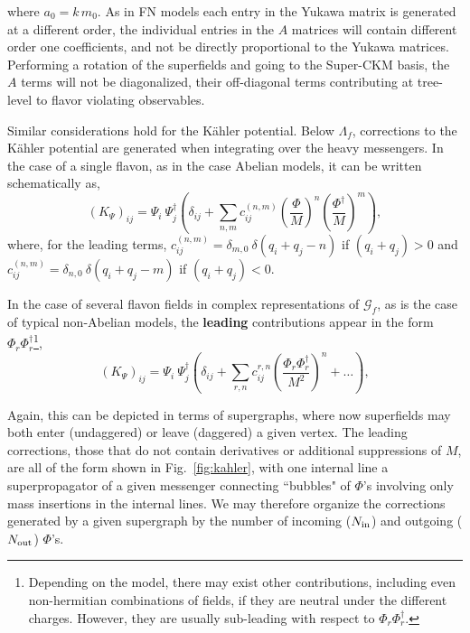 \documentclass[a4paper,11pt]{article}
\begin{document}
where $a_0=k\, m_0$. %
As in FN models each entry in the Yukawa matrix is generated at a different order, the individual entries in the $A$ matrices will contain different order one coefficients, and not be directly proportional to the Yukawa matrices. Performing a rotation of the superfields and going to the Super-CKM basis, the $A$ terms will not be diagonalized, their off-diagonal terms contributing at tree-level to flavor violating observables.

Similar considerations hold for the K\"ahler potential. Below $\Lambda_f$, corrections to the K\"ahler potential are generated when integrating over the heavy messengers. In the case of a single flavon, as in the case Abelian models, it can be written schematically as, 
\begin{equation} \label{eq:kahler}
(K_\Psi)_{ij} = \Psi_i ~\Psi^{\dagger}_j \left(\delta_{ij} + \sum_{n,m} c_{ij}^{(n,m)} \left(\frac{\Phi}{M} \right)^n  \left(\frac{\Phi^\dagger}{M} \right)^m \right),
\end{equation}
where, for the leading terms, $c_{ij}^{(n,m)} = \delta_{m,0}~ \delta (q_i + q_j - n)$ if $(q_i+q_j) > 0$ and  $c_{ij}^{(n,m)} =\delta_{n,0}~ \delta (q_i + q_j - m)$ if $(q_i+q_j) < 0$.

In the case of several flavon fields in complex representations of $\mathcal{G}_f$, as is the case of typical non-Abelian models, the {\bf leading} contributions appear in the form $\Phi_r \Phi_r^{\dagger}$\footnote{Depending on the model, there may exist other contributions, including even non-hermitian combinations of fields, if they are neutral under the different charges. However, they are usually sub-leading with respect to $\Phi_r \Phi_r^{\dagger}$.},
\begin{equation} \label{eq:kahler2}
(K_\Psi)_{ij} = \Psi_i ~\Psi^{\dagger}_j \left(\delta_{ij} + \sum_{r,n} c_{ij}^{r,n} \left(\frac{\Phi_r \Phi_r^\dagger}{M^2} \right)^n + \dots \right),
\end{equation}

Again, this can be depicted in terms of supergraphs, where now superfields may both enter (undaggered) or leave (daggered) a given vertex. The leading corrections, those that do not contain derivatives or additional suppressions of $M$, are all of the form shown in Fig.~\ref{fig:kahler}, with one internal line a superpropagator of a given messenger connecting ``bubbles" of $\Phi$'s involving only mass insertions in the internal lines. We may therefore organize the corrections generated by a given supergraph by the number of incoming ($N_{\rm in}$) and outgoing ($N_{\rm out}$) $\Phi$'s.
\end{document}
